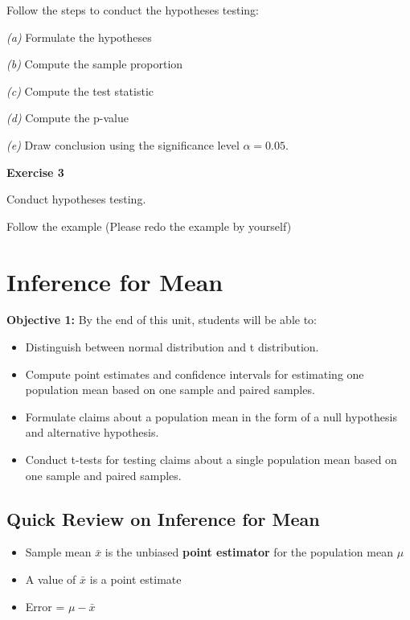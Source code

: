 \documentclass[
]{book}
\providecommand{\tightlist}{%
  \setlength{\itemsep}{0pt}\setlength{\parskip}{0pt}}
\begin{document}
Follow the steps to conduct the hypotheses testing:

\emph{(a)} Formulate the hypotheses

\emph{(b)} Compute the sample proportion

\emph{(c)} Compute the test statistic

\emph{(d)} Compute the p-value

\emph{(e)} Draw conclusion using the significance level \(\alpha=0.05\).

\textbf{Exercise 3}

Conduct hypotheses testing.

Follow the example (Please redo the example by yourself)

\chapter{Inference for Mean}\label{inference-for-mean}

\textbf{Objective 1:} By the end of this unit, students will be able to:

\begin{itemize}
\tightlist
\item
  Distinguish between normal distribution and t distribution.
\item
  Compute point estimates and confidence intervals for estimating one population mean based on one sample and paired samples.
\item
  Formulate claims about a population mean in the form of a null hypothesis and alternative hypothesis.
\item
  Conduct t-tests for testing claims about a single population mean based on one sample and paired samples.
\end{itemize}

\section{Quick Review on Inference for Mean}\label{quick-review-on-inference-for-mean}

\begin{itemize}
\tightlist
\item
  Sample mean \(\bar{x}\) is the unbiased \textbf{point estimator} for the population mean \(\mu\)
\item
  A value of \(\bar{x}\) is a point estimate
\item
  Error = \(\mu - \bar{x}\)
\end{itemize}
\end{document}
